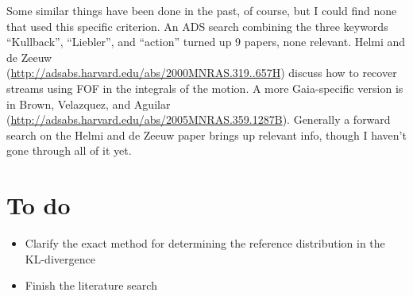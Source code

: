 \documentclass[useAMS,usenatbib,a4paper,referee]{mn2e}
\begin{document}
Some similar things have been done in the past, of course, but I could find none that used this specific criterion. An ADS search combining the three keywords ``Kullback'', ``Liebler'', and ``action'' turned up 9 papers, none relevant. Helmi and de Zeeuw \\(\url{http://adsabs.harvard.edu/abs/2000MNRAS.319..657H}) discuss how to recover streams using FOF in the integrals of the motion.  A more Gaia-specific version is in Brown, Velazquez, and Aguilar \\(\url{http://adsabs.harvard.edu/abs/2005MNRAS.359.1287B}). Generally a forward search on the Helmi and de Zeeuw paper brings up relevant info, though I haven't gone through all of it yet.

\section{To do}
\label{sec:todo}

\begin{itemize}
 \item Clarify the exact method for determining the reference distribution in the KL-divergence
 \item Finish the literature search
\end{itemize}


%
\end{document}
